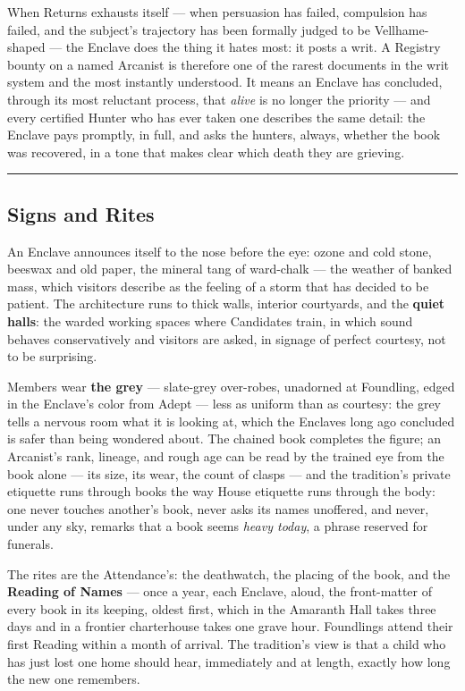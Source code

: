 When Returns exhausts itself --- when persuasion has failed, compulsion has failed, and the subject's trajectory has been formally judged to be Vellhame-shaped --- the Enclave does the thing it hates most: it posts a writ. A Registry bounty on a named Arcanist is therefore one of the rarest documents in the writ system and the most instantly understood. It means an Enclave has concluded, through its most reluctant process, that \textit{alive} is no longer the priority --- and every certified Hunter who has ever taken one describes the same detail: the Enclave pays promptly, in full, and asks the hunters, always, whether the book was recovered, in a tone that makes clear which death they are grieving.

\medskip\hrule\medskip

\subsection{Signs and Rites}

An Enclave announces itself to the nose before the eye: ozone and cold stone, beeswax and old paper, the mineral tang of ward-chalk --- the weather of banked mass, which visitors describe as the feeling of a storm that has decided to be patient. The architecture runs to thick walls, interior courtyards, and the \textbf{quiet halls}: the warded working spaces where Candidates train, in which sound behaves conservatively and visitors are asked, in signage of perfect courtesy, not to be surprising.

Members wear \textbf{the grey} --- slate-grey over-robes, unadorned at Foundling, edged in the Enclave's color from Adept --- less as uniform than as courtesy: the grey tells a nervous room what it is looking at, which the Enclaves long ago concluded is safer than being wondered about. The chained book completes the figure; an Arcanist's rank, lineage, and rough age can be read by the trained eye from the book alone --- its size, its wear, the count of clasps --- and the tradition's private etiquette runs through books the way House etiquette runs through the body: one never touches another's book, never asks its names unoffered, and never, under any sky, remarks that a book seems \textit{heavy today}, a phrase reserved for funerals.

The rites are the Attendance's: the deathwatch, the placing of the book, and the \textbf{Reading of Names} --- once a year, each Enclave, aloud, the front-matter of every book in its keeping, oldest first, which in the Amaranth Hall takes three days and in a frontier charterhouse takes one grave hour. Foundlings attend their first Reading within a month of arrival. The tradition's view is that a child who has just lost one home should hear, immediately and at length, exactly how long the new one remembers.

